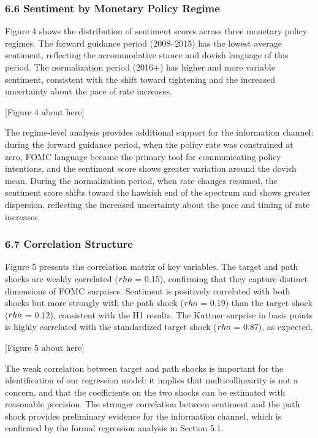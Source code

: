 \documentclass[12pt]{article}
\begin{document}
\subsubsection{6.6 Sentiment by Monetary Policy
Regime}\label{sentiment-by-monetary-policy-regime}

Figure 4 shows the distribution of sentiment scores across three
monetary policy regimes. The forward guidance period (2008--2015) has
the lowest average sentiment, reflecting the accommodative stance and
dovish language of this period. The normalization period (2016+) has
higher and more variable sentiment, consistent with the shift toward
tightening and the increased uncertainty about the pace of rate
increases.

{[}Figure 4 about here{]}

The regime-level analysis provides additional support for the
information channel: during the forward guidance period, when the policy
rate was constrained at zero, FOMC language became the primary tool for
communicating policy intentions, and the sentiment score shows greater
variation around the dovish mean. During the normalization period, when
rate changes resumed, the sentiment score shifts toward the hawkish end
of the spectrum and shows greater dispersion, reflecting the increased
uncertainty about the pace and timing of rate increases.

\subsubsection{6.7 Correlation Structure}\label{correlation-structure}

Figure 5 presents the correlation matrix of key variables. The target
and path shocks are weakly correlated (\(\\rho\) = 0.15), confirming
that they capture distinct dimensions of FOMC surprises. Sentiment is
positively correlated with both shocks but more strongly with the path
shock (\(\\rho\) = 0.19) than the target shock (\(\\rho\) = 0.12),
consistent with the H1 results. The Kuttner surprise in basis points is
highly correlated with the standardized target shock (\(\\rho\) = 0.87),
as expected.

{[}Figure 5 about here{]}

The weak correlation between target and path shocks is important for the
identification of our regression model: it implies that
multicollinearity is not a concern, and that the coefficients on the two
shocks can be estimated with reasonable precision. The stronger
correlation between sentiment and the path shock provides preliminary
evidence for the information channel, which is confirmed by the formal
regression analysis in Section 5.1.
\end{document}

